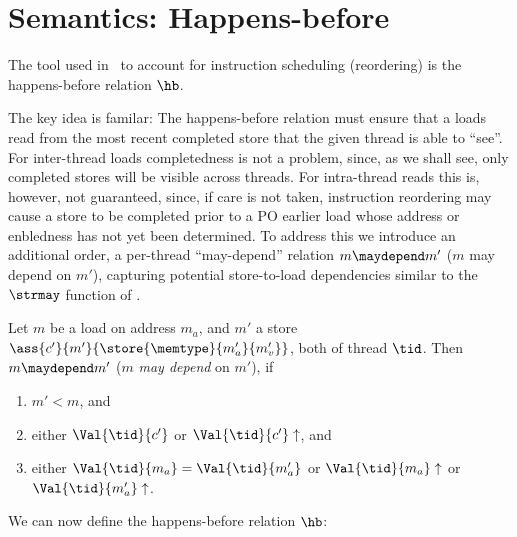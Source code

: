 \section{Semantics: Happens-before}

The tool used in \MCMIL\ to account for instruction scheduling (reordering) is the happens-before relation $\hb$.

The key idea is familar: The happens-before relation must ensure that a
loads read from the most recent completed store that the given thread is able to ``see''. For inter-thread loads completedness is not a problem, since, as we shall see, only completed stores will be visible across threads. For intra-thread reads this is, however, not guaranteed, since, if care is not taken, instruction reordering may cause a store to be completed prior to a PO earlier load whose address or enbledness has not yet been determined. To address this we introduce an additional order, a per-thread ``may-depend'' relation $m\maydepend m'$ ($m$ may depend on $m'$), capturing potential store-to-load dependencies similar to the $\strmay$ function of \cite{MIL}.

\begin{definition}
Let $m$ be a load on address $m_a$, and $m'$ a store $\ass{c'}{m'}{\store{\memtype}{m_a'}{m_v'}}$, both of thread $\tid$. Then $m\maydepend m'$ ($m$ \emph{may depend} on $m'$), if
\begin{enumerate}
\item $m' < m$, and
\item either $\Val{\tid}{c'}$ or $\Val{\tid}{c'}\uparrow$, and
\item either
$\Val{\tid}{m_a}=\Val{\tid}{m_a'}$ or $\Val{\tid}{m_a}\uparrow$ or $\Val{\tid}{m_a'}\uparrow$.
\end{enumerate}
\end{definition}

We can now define the happens-before relation $\hb$:

